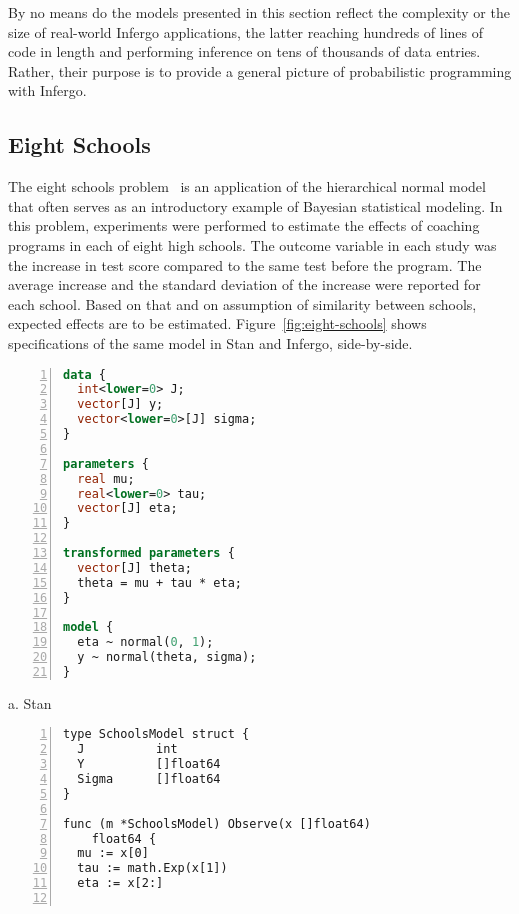 \documentclass[sigplan,screen]{acmart}
\begin{document}
\begin{sloppypar}
By no means do the models presented in this section reflect the
complexity or the size of real-world Infergo applications, the
latter reaching hundreds of lines of code in length and
performing inference on tens of thousands of data entries.
Rather, their purpose is to provide a general picture of
probabilistic programming with Infergo.

\subsection{Eight Schools}
\label{sec:eight-schools}

The eight schools problem~\cite{GCS+03} is an application of
the hierarchical normal model that often serves as an introductory
example of Bayesian statistical modeling.  In this problem,
experiments were performed to estimate the effects of coaching
programs in each of eight high schools. The outcome variable in
each study was the increase in test score compared to the same
test before the program. The average increase and the standard
deviation of the increase were reported for each school. Based
on that and on assumption of similarity between schools,
expected effects are to be estimated.
Figure~\ref{fig:eight-schools} shows specifications of the same
model in Stan and Infergo, side-by-side.
\begin{figure*}
\begin{minipage}[t]{0.45\textwidth}
  \begin{lstlisting}[language=Stan,xleftmargin=11pt,framexleftmargin=10pt,numbers=left]
data {
  int<lower=0> J;
  vector[J] y;
  vector<lower=0>[J] sigma;
}

parameters {
  real mu;
  real<lower=0> tau;
  vector[J] eta;
}

transformed parameters {
  vector[J] theta;
  theta = mu + tau * eta;
}

model {
  eta ~ normal(0, 1);
  y ~ normal(theta, sigma);
}
\end{lstlisting}

\centering
a. Stan
  \end{minipage}
  \hfill
\begin{minipage}[t]{0.5\textwidth}
\begin{lstlisting}[xleftmargin=11pt,framexleftmargin=10pt,numbers=left]
type SchoolsModel struct {
  J          int
  Y          []float64
  Sigma      []float64
}

func (m *SchoolsModel) Observe(x []float64)
    float64 {
  mu := x[0]
  tau := math.Exp(x[1])
  eta := x[2:]


\end{lstlisting}
\end{minipage}
\end{figure*}
\end{sloppypar}
\end{document}

